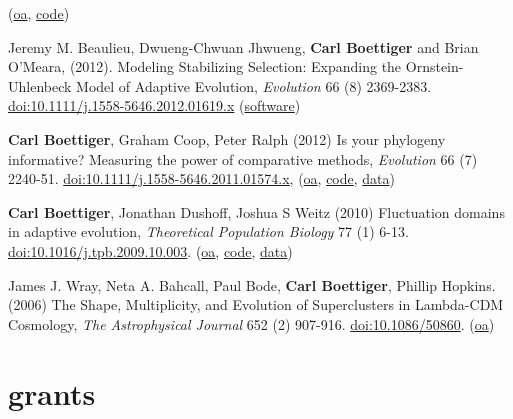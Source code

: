 \documentclass[10pt,sans]{moderncv}        %
\renewenvironment{enumerate}{\begin{etaremune}}{\end{etaremune}}
\begin{document}
\begin{enumerate}
  (\href{http://arxiv.org/abs/1204.6231}{oa},
  \href{https://github.com/cboettig/earlywarning}{code})
\item
  Jeremy M. Beaulieu, Dwueng-Chwuan Jhwueng, \textbf{Carl Boettiger} and
  Brian O'Meara, (2012). Modeling Stabilizing Selection: Expanding the
  Ornstein-Uhlenbeck Model of Adaptive Evolution, \emph{Evolution} 66
  (8) 2369-2383.
  \href{http://dx.doi.org/10.1111/j.1558-5646.2012.01619.x}{doi:10.1111/j.1558-5646.2012.01619.x}
  (\href{http://cran.r-project.org/web/packages/OUwie/index.html}{software})
\item
  \textbf{Carl Boettiger}, Graham Coop, Peter Ralph (2012) Is your
  phylogeny informative? Measuring the power of comparative methods,
  \emph{Evolution} 66 (7) 2240-51.
  \href{http://dx.doi.org/10.1111/j.1558-5646.2011.01574.x}{doi:10.1111/j.1558-5646.2011.01574.x},
  (\href{http://arxiv.org/abs/1110.4944}{oa},
  \href{https://github.com/cboettig/pmc}{code},
  \href{http://datadryad.org/handle/10255/dryad.37645}{data})
\item
  \textbf{Carl Boettiger}, Jonathan Dushoff, Joshua S Weitz (2010)
  Fluctuation domains in adaptive evolution, \emph{Theoretical
  Population Biology} 77 (1) 6-13.
  \href{http://dx.doi.org/10.1016/j.tpb.2009.10.003}{doi:10.1016/j.tpb.2009.10.003}.
  (\href{http://arxiv.org/abs/1004.4233}{oa},
  \href{https://github.com/cboettig/fluctuationDomains}{code},
  \href{http://datadryad.org/handle/10255/dryad.37625}{data})
\item
  James J. Wray, Neta A. Bahcall, Paul Bode, \textbf{Carl Boettiger},
  Phillip Hopkins. (2006) The Shape, Multiplicity, and Evolution of
  Superclusters in Lambda-CDM Cosmology, \emph{The Astrophysical
  Journal} 652 (2) 907-916.
  \href{http://dx.doi.org/10.1086/508600}{doi:10.1086/50860}.
  (\href{http://arxiv.org/abs/astro-ph/0603060}{oa})
\end{enumerate}

\section{grants}\label{grants}
\end{document}
